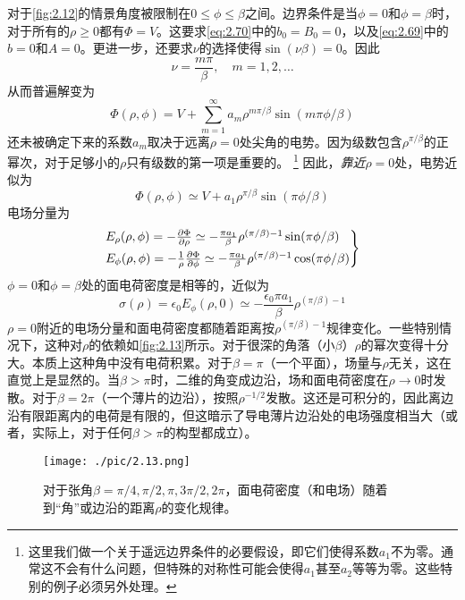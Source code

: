 \documentclass[12pt]{book}
\numberwithin{equation}{chapter}
\numberwithin{figure}{chapter}
\numberwithin{footnote}{page}
\begin{document}
对于\autoref{fig:2.12}的情景角度被限制在$0\leq \phi \leq\beta$之间。边界条件是当$\phi=0$和$\phi=\beta$时，对于所有的$\rho\geq 0$都有$\Phi=V$。这要求\autoref{eq:2.70}中的$b_0=B_0=0$，以及\autoref{eq:2.69}中的$b=0$和$A=0$。更进一步，还要求$\nu$的选择使得$\sin(\nu\beta)=0$。因此
$$\nu=\frac{m\pi}{\beta}, \quad m=1,2,\dots$$
从而普遍解变为
\begin{equation}\label{eq:2.72}
    \Phi(\rho,\phi)=V+\sum_{m=1}^\infty a_m\rho^{m\pi/\beta}\sin(m\pi\phi/\beta)
\end{equation}
还未被确定下来的系数$a_m$取决于远离$\rho=0$处尖角的电势。因为级数包含$\rho^{\pi/\beta}$的正幂次，对于足够小的$\rho$只有级数的第一项是重要的。
\footnote{这里我们做一个关于遥远边界条件的必要假设，即它们使得系数$a_1$不为零。通常这不会有什么问题，但特殊的对称性可能会使得$a_1$甚至$a_2$等等为零。这些特别的例子必须另外处理。}
因此，\textit{靠近}$\rho=0$处，电势近似为
\begin{equation}\label{eq:2.73}
    \Phi(\rho,\phi)\simeq V+a_1\rho^{\pi/\beta}\sin(\pi\phi/\beta)
\end{equation}
电场分量为
\begin{equation}\label{eq:2.74}
    \begin{rcases*}
        E_{\rho}(\rho,\phi)=-\frac{\partial\Phi}{\partial\rho}\simeq-\frac{\pi a_1}{\beta}\rho^{(\pi/\beta)-1}\sin(\pi\phi/\beta)\\
        E_{\phi}(\rho,\phi)=-\frac{1}{\rho}\frac{\partial\Phi}{\partial\phi}\simeq-\frac{\pi a_1}{\beta}\rho^{(\pi/\beta)-1}\cos(\pi\phi/\beta)\\
    \end{rcases*}
\end{equation}
$\phi=0$和$\phi=\beta$处的面电荷密度是相等的，近似为
\begin{equation}\label{eq:2.75}
    \sigma(\rho)=\epsilon_0 E_{\phi}(\rho,0)\simeq-\frac{\epsilon_0 \pi a_1}{\beta}\rho^{(\pi/\beta)-1}
\end{equation}
$\rho=0$附近的电场分量和面电荷密度都随着距离按$\rho^{(\pi/\beta)-1}$规律变化。一些特别情况下，这种对$\rho$的依赖如\autoref{fig:2.13}所示。对于很深的角落（小$\beta$）$\rho$的幂次变得十分大。本质上这种角中没有电荷积累。对于$\beta=\pi$（一个平面），场量与$\rho$无关，这在直觉上是显然的。当$\beta>\pi$时，二维的角变成边沿，场和面电荷密度在$\rho\to0$时发散。对于$\beta=2\pi$（一个薄片的边沿），按照$\rho^{-1/2}$发散。这还是可积分的，因此离边沿有限距离内的电荷是有限的，但这暗示了导电薄片边沿处的电场强度相当大（或者，实际上，对于任何$\beta>\pi$的构型都成立）。

\begin{figure}[!ht]
    \centering
    \texttt{[image: ./pic/2.13.png]}
    \captionsetup{justification=raggedright, singlelinecheck=false}
    \caption{对于张角$\beta=\pi/4,\pi/2,\pi,3\pi/2,2\pi$，面电荷密度（和电场）随着到“角”或边沿的距离$\rho$的变化规律。}
    \label{fig:2.13}
\end{figure}
\end{document}
